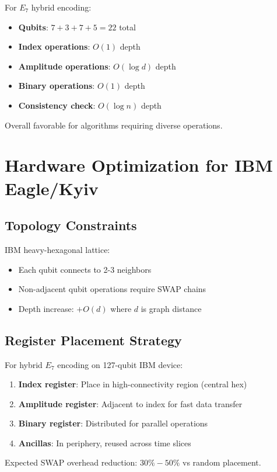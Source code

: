 \begin{theorem}
\label{thm:hybrid_efficiency}
For $E_7$ hybrid encoding:
\begin{itemize}
    \item \textbf{Qubits}: $7 + 3 + 7 + 5 = 22$ total
    \item \textbf{Index operations}: $O(1)$ depth
    \item \textbf{Amplitude operations}: $O(\log d)$ depth
    \item \textbf{Binary operations}: $O(1)$ depth
    \item \textbf{Consistency check}: $O(\log n)$ depth
\end{itemize}

Overall favorable for algorithms requiring diverse operations.
\end{theorem}

\section{Hardware Optimization for IBM Eagle/Kyiv}

\subsection{Topology Constraints}

IBM heavy-hexagonal lattice:
\begin{itemize}
    \item Each qubit connects to 2-3 neighbors
    \item Non-adjacent qubit operations require SWAP chains
    \item Depth increase: $+O(d)$ where $d$ is graph distance
\end{itemize}

\subsection{Register Placement Strategy}

\begin{proposition}
\label{prop:optimal_mapping}
For hybrid $E_7$ encoding on 127-qubit IBM device:
\begin{enumerate}
    \item \textbf{Index register}: Place in high-connectivity region (central hex)
    \item \textbf{Amplitude register}: Adjacent to index for fast data transfer
    \item \textbf{Binary register}: Distributed for parallel operations
    \item \textbf{Ancillas}: In periphery, reused across time slices
\end{enumerate}

Expected SWAP overhead reduction: $30\%-50\%$ vs random placement.
\end{proposition}

